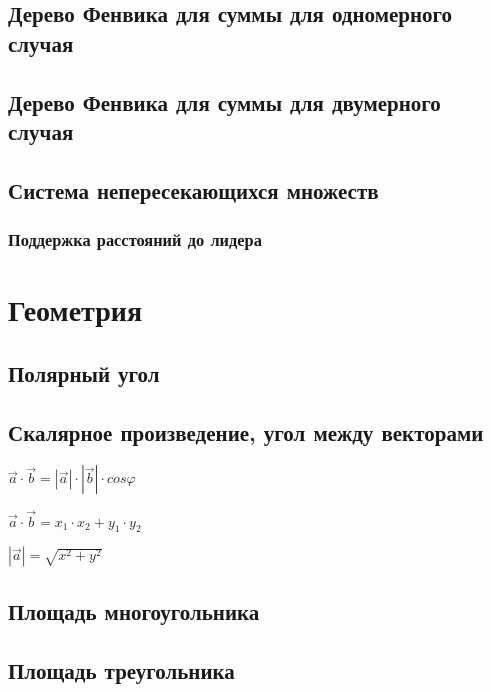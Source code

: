 \documentclass[a4paper]{article}
\begin{document}
\begin{multicols*}{2}
		 \subsection{Дерево Фенвика для суммы для одномерного случая}
		 		 
		 \subsection{Дерево Фенвика для суммы для двумерного случая}
		 
		 \subsection{Система непересекающихся множеств}
		 
		 \subsubsection{Поддержка расстояний до лидера}
		 
		 
		 \section{Геометрия}
		 \subsection{Полярный угол}
		 
		 \subsection{Скалярное произведение, угол между векторами}
		 
		 $\vec a \cdot \vec b = |\vec a| \cdot |\vec b| \cdot cos \varphi$
		 
		 $\vec a \cdot \vec b = x_1 \cdot x_2 + y_1 \cdot y_2$
		 
		 $|\vec a| = \sqrt{x^2 + y^2}$
		 
		 \subsection{Площадь многоугольника}
		 		 
		 \subsection{Площадь треугольника}
		 

\end{multicols*}
\end{document}

